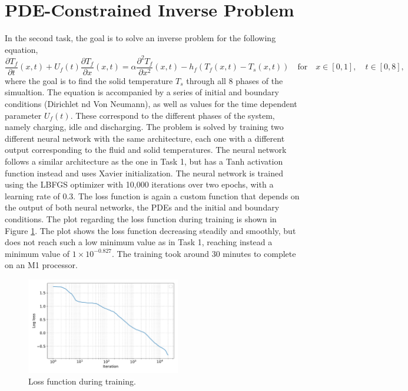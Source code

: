 \documentclass[unicode,11pt,a4paper,oneside,numbers=endperiod,openany]{scrartcl}
\begin{document}
\section{PDE-Constrained Inverse Problem}\label{sec:task2}
In the second task, the goal is to solve an inverse problem for the following
equation,
\begin{equation}
    \frac{\partial T_f}{\partial t}(x,t) + U_f(t)\frac{\partial T_f}{\partial x}(x,t) = \alpha \frac{\partial^2 T_f}{\partial x^2} (x,t) - h_f(T_f(x,t)-T_s(x,t)) \quad \text{for} \quad x \in [0, 1], \quad t \in [0, 8],
\end{equation}
where the goal is to find the solid temperature $T_s$ through all 8 phases of
the simualtion. The equation is accompanied by a series of initial and boundary
conditions (Dirichlet nd Von Neumann), as well as values for the time dependent
parameter $U_f(t)$. These correspond to the different phases of the system,
namely charging, idle and discharging. The problem is solved by
training two different neural
network with the same architecture, each one with a different output
corresponding to the fluid and solid temperatures. The neural network follows a
similar architecture as the one in Task 1, but has a Tanh activation function
instead and uses Xavier initialization. 
The neural network is trained using the
LBFGS optimizer with 10,000 iterations over two epochs, with a learning rate of 0.3. The loss
function is again a custom function that depends on the output of both neural
networks, the PDEs and the initial and boundary conditions. The plot regarding the loss
function during training is shown in Figure \ref{fig:task2_loss}. The plot shows
the loss function decreasing steadily and smoothly, but does not reach such a
low minimum value as in Task 1, reaching instead a minimum value of $1\times 10^{-0.827}$.
The training took around 30 minutes to complete on an M1 processor.
\begin{figure}
    \centering
    \includegraphics[width=0.6\textwidth]{../Proj1_Y24/Task2/loss.pdf}
    \caption{Loss function during training.}
    \label{fig:task2_loss}
\end{figure}
\end{document}
